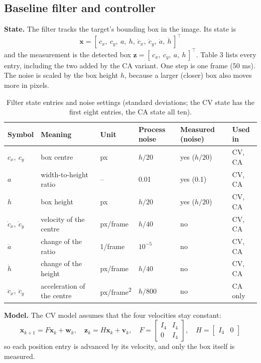 \documentclass[12pt,a4paper]{article}
\begin{document}
\subsection{Baseline filter and controller}
\textbf{State.} The filter tracks the target's bounding box in the image. Its state is
\begin{equation}
  \mathbf{x} = [\,c_x,\ c_y,\ a,\ h,\ \dot c_x,\ \dot c_y,\ \dot a,\ \dot h\,]^{\top}
\end{equation}
and the measurement is the detected box $\mathbf{z} = [\,c_x,\ c_y,\ a,\ h\,]^{\top}$. Table 3 lists every entry, including the two added by the CA variant. One step is one frame (50 ms). The noise is scaled by the box height $h$, because a larger (closer) box also moves more in pixels.

\begin{table}[H]
  \centering
  \small
  \caption{Filter state entries and noise settings (standard deviations; the CV state has the first eight entries, the CA state all ten).}
  \renewcommand{\arraystretch}{1.15}
  \begin{tabular}{llllll}
  \toprule
  \textbf{Symbol} & \textbf{Meaning} & \textbf{Unit} & \textbf{Process noise} & \textbf{Measured (noise)} & \textbf{Used in} \\
  \midrule
  $c_x,\ c_y$ & box centre & px & $h/20$ & yes ($h/20$) & CV, CA \\
  $a$ & width-to-height ratio & -- & 0.01 & yes (0.1) & CV, CA \\
  $h$ & box height & px & $h/20$ & yes ($h/20$) & CV, CA \\
  $\dot c_x,\ \dot c_y$ & velocity of the centre & px/frame & $h/40$ & no & CV, CA \\
  $\dot a$ & change of the ratio & 1/frame & $10^{-5}$ & no & CV, CA \\
  $\dot h$ & change of the height & px/frame & $h/40$ & no & CV, CA \\
  $\ddot c_x,\ \ddot c_y$ & acceleration of the centre & px/frame\textsuperscript{2} & $h/800$ & no & CA only \\
  \bottomrule
  \end{tabular}
\end{table}

\textbf{Model.} The CV model assumes that the four velocities stay constant:
\begin{equation}
  \mathbf{x}_{k+1} = F\mathbf{x}_k + \mathbf{w}_k,\quad \mathbf{z}_k = H\mathbf{x}_k + \mathbf{v}_k,\quad F=\begin{bmatrix} I_4 & I_4\\ 0 & I_4\end{bmatrix},\quad H=\begin{bmatrix} I_4 & 0\end{bmatrix}
\end{equation}
so each position entry is advanced by its velocity, and only the box itself is measured.
\end{document}
